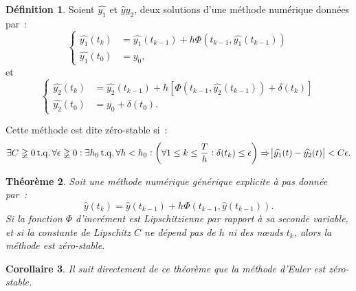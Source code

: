 \documentclass{article}
\newtheorem{thm}{Théorème}[section]
\newtheorem{cor}[thm]{Corollaire}
\theoremstyle{definition}
\newtheorem{déf}[thm]{Définition}
\theoremstyle{remark}
\DeclareMathOperator{\tq}{t.q.}  %
\begin{document}
		\begin{déf} Soient $\widehat {y_1}$ et $\widehat y{y_2}$, deux solutions d'une méthode numérique données par~:
		\[\begin{cases}\widehat {y_1}
			(t_k) &= \widehat {y_1}(t_{k-1}) + h\Phi(t_{k-1}, \widehat {y_1}(t_{k-1})) \\
			\widehat {y_1}(t_0) &= y_0,
		\end{cases}\]
		et
		\[\begin{cases}
			\widehat {y_2}(t_k) &= \widehat {y_2}(t_{k-1}) + h\left[\Phi(t_{k-1}, \widehat {y_2}(t_{k-1})) + \delta(t_k)\right] \\
			\widehat {y_2}(t_0) &= y_0 + \delta(t_0).
		\end{cases}\]

		Cette méthode est dite zéro-stable si~:
		\[\exists C \gneqq 0 \tq \forall \epsilon \gneqq 0 : \exists h_0 \tq \forall h < h_0 :
			\left(\forall 1 \leq k \leq \frac Th : \delta(t_k) \leq \epsilon\right) \Rightarrow \abs {\widehat {y_1}(t) - \widehat {y_2}(t)} < C\epsilon.\]
		\end{déf}

		\begin{thm} Soit une méthode numérique générique explicite à pas donnée par~:
		\[\widehat y(t_k) = \widehat y(t_{k-1}) + h\Phi(t_{k-1}, \widehat y(t_{k-1})).\]
		Si la fonction $\Phi$ d'incrément est Lipschitzienne par rapport à sa seconde variable, et si la constante de Lipschitz $C$ ne dépend pas de $h$ ni des
		nœuds $t_k$, alors la méthode est zéro-stable.
		\end{thm}

		\begin{cor} Il suit directement de ce théorème que la méthode d'Euler est zéro-stable. \end{cor}
\end{document}
